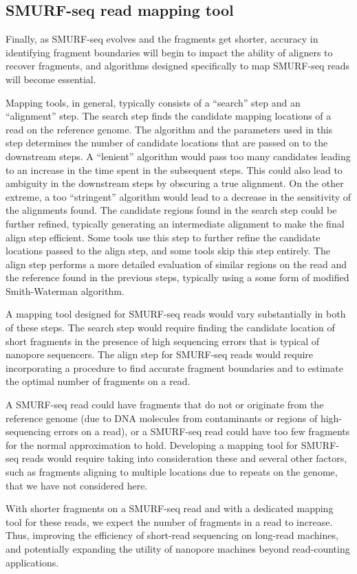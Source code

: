 \subsection*{SMURF-seq read mapping tool}
Finally, as SMURF-seq evolves and the fragments get shorter, accuracy in
identifying fragment boundaries will begin to impact the ability of
aligners to recover fragments, and algorithms designed specifically to
map SMURF-seq reads will become essential.

Mapping tools, in general, typically consists of a ``search'' step and
an ``alignment'' step.
The search step finds the candidate mapping locations of a read on the
reference genome. The algorithm and the parameters used in this step
determines the number of candidate locations that are passed on to the
downstream steps. A ``lenient'' algorithm would pass too many candidates
leading to an increase in the time spent in the subsequent steps. This
could also lead to ambiguity in the downstream steps by obscuring a true
alignment. On the other extreme, a too ``stringent'' algorithm would
lead to a decrease in the sensitivity of the alignments found.
The candidate regions found in the search step could be further refined,
typically generating an intermediate alignment to make the final align
step efficient. Some tools use this step to further refine the candidate
locations passed to the align step, and some tools skip this step
entirely.
The align step performs a more detailed evaluation of similar regions on
the read and the reference found in the previous steps, typically using
a some form of modified Smith-Waterman algorithm.

A mapping tool designed for SMURF-seq reads would vary substantially in
both of these steps. The search step would require finding the candidate
location of short fragments in the presence of high sequencing errors
that is typical of nanopore sequencers.
The align step for SMURF-seq reads would require incorporating a
procedure to find accurate fragment boundaries and to estimate the
optimal number of fragments on a read.

A SMURF-seq read could have fragments that do not or originate from the
reference genome (due to DNA molecules from contaminants or regions of
high-sequencing errors on a read),
or a SMURF-seq read could have too few fragments for the normal
approximation to hold.
%
Developing a mapping tool for SMURF-seq reads would require taking into
consideration these and several other factors, such as fragments
aligning to multiple locations due to repeats on the genome, that we
have not considered here.

With shorter fragments on a SMURF-seq read and with a dedicated mapping
tool for these reads, we expect the number of fragments in a read to
increase. Thus, improving the efficiency of short-read sequencing on
long-read machines, and potentially expanding the utility of nanopore
machines beyond read-counting applications.
